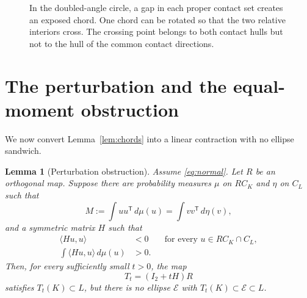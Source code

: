 \documentclass[11pt]{amsart}
\newtheorem{lemma}[theorem]{Lemma}
\theoremstyle{definition}
\theoremstyle{remark}
\newcommand{\ip}[2]{\langle #1,#2\rangle}
\begin{document}
\begin{figure}[t]
\centering
{}
\caption{In the doubled-angle circle, a gap in each proper contact set creates
an exposed chord.  One chord can be rotated so that the two relative
interiors cross.  The crossing point belongs to both contact hulls but not to
the hull of the common contact directions.}
\label{fig:chords}
\end{figure}

\section{The perturbation and the equal-moment obstruction}\label{sec:perturb}

We now convert Lemma~\ref{lem:chords} into a linear contraction with no
ellipse sandwich.

\begin{lemma}[Perturbation obstruction]\label{lem:perturb}
Assume \eqref{eq:normal}.  Let $R$ be an orthogonal map.  Suppose there are
probability measures $\mu$ on $R C_K$ and $\eta$ on $C_L$ such that
\begin{equation}\label{eq:same-moment}
 M:=\int uu^{\mathsf T}\,d\mu(u)
 =\int vv^{\mathsf T}\,d\eta(v),
\end{equation}
and a symmetric matrix $H$ such that
\begin{align}
 \ip{Hu}{u}&<0 &&\text{for every }u\in R C_K\cap C_L,
 \label{eq:negative-common}\\
 \int\ip{Hu}{u}\,d\mu(u)&>0.\label{eq:positive-average}
\end{align}
Then, for every sufficiently small $t>0$, the map
\[
 T_t=(I_2+tH)R
\]
satisfies $T_t(K)\subset L$, but there is no ellipse $\mathcal E$ with
$T_t(K)\subset\mathcal E\subset L$.
\end{lemma}
\end{document}
